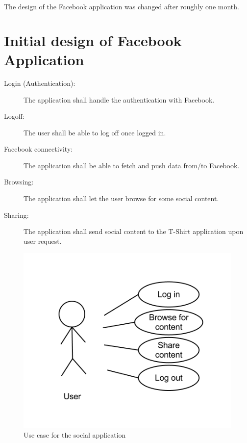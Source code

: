   The design of the Facebook application was changed after roughly one month.

  \section{Initial design of Facebook Application}

  \begin{description}
    \item[Login (Authentication):] The application shall handle the authentication with Facebook.
    \item[Logoff:] The user shall be able to log off once logged in.
    \item[Facebook connectivity:] The application shall be able to fetch and push data from/to Facebook.
    \item[Browsing:] The application shall let the user browse for some social content.
    \item[Sharing:] The application shall send social content to the T-Shirt application
    upon user request.
  \end{description}

  \begin{figure}[h!]
  \centering \includegraphics[scale=0.50]{img/req-socialappusecase1.png}
  \caption{Use case for the social application}
  \label{fig:req-tshirtappusecase1}
  \end{figure}

  

